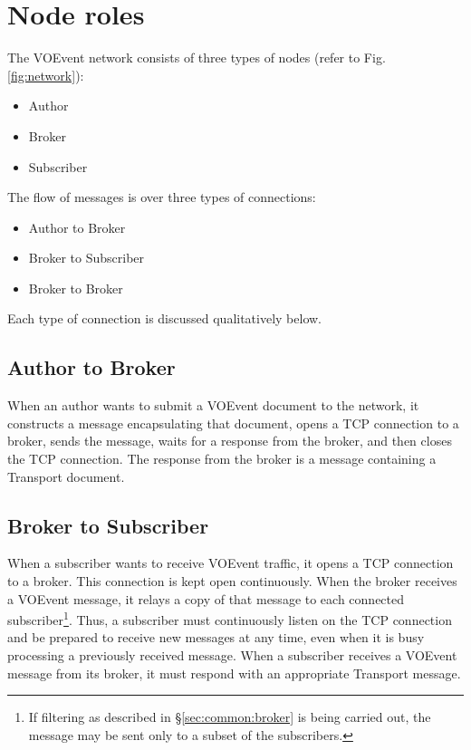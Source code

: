 \documentclass[a4paper,11pt]{ivoa}
\begin{document}
\section{Node roles}
\label{sec:noderoles}

The VOEvent network consists of three types of nodes (refer to Fig.
\ref{fig:network}):

\begin{itemize}
    \item{Author}
    \item{Broker}
    \item{Subscriber}
\end{itemize}

The flow of messages is over three types of connections:

\begin{itemize}
    \item{Author to Broker}
    \item{Broker to Subscriber}
    \item{Broker to Broker}
\end{itemize}

Each type of connection is discussed qualitatively below.

\subsection{Author to Broker}

When an author wants to submit a VOEvent document to the network, it
constructs a message encapsulating that document, opens a TCP connection to a
broker, sends the message, waits for a response from the broker, and then
closes the TCP connection. The response from the broker is a message
containing a Transport document.

\subsection{Broker to Subscriber}

When a subscriber wants to receive VOEvent traffic, it opens a TCP connection
to a broker. This connection is kept open continuously. When the broker
receives a VOEvent message, it relays a copy of that message to each connected
subscriber\footnote{If filtering as described in \S\ref{sec:common:broker} is
being carried out, the message may be sent only to a subset of the
subscribers.}.  Thus, a subscriber must continuously listen on the TCP
connection and be prepared to receive new messages at any time, even when it
is busy processing a previously received message. When a subscriber receives a
VOEvent message from its broker, it must respond with an appropriate Transport
message.
\end{document}
